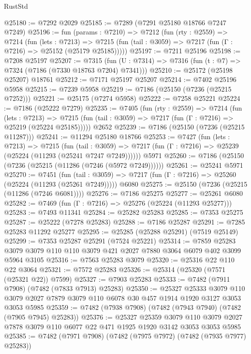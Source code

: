 \begin{lexlean}{RustStd}
\begin{coremodule}
{\begin{coremodule}
{{{{{{{{{{{{{{{{{{{{{{{{{{{{{{{{@25180 := @7292 @2029
@25185 := @7289 (@7291 @25180 @18766 @7247 @7249)
@25196 := fun (params : @7210) =>
  @7212
    (fun (rty : @2559) =>
    @7214
      (fun (lets : @7213) =>
      @7215 (fun (tail : @3059) => @7217 (fun (Γ : @7216) => @25152 (@25179 @25185)))))
@25197 := @7211 @25196
@25198 := @7208 @25197
@25207 := @7315
    (fun (U : @7314) => @7316 (fun (t : @7) => @7324 (@7186 (@7330 @18763 @7204) @7341)))
@25210 := @25172 (@25198 @25207) @18761
@25212 := @7171 @25197 @25207
@25214 := @7402 @25196 @5958
@25215 := @7239 @5958
@25219 := @7186 (@25150 (@7236 (@25215 @7252)))
@25221 := @25175 (@7274 @5958)
@25222 := @7258 @25221
@25224 := @7186 (@25222 @7279)
@25235 := @7405
    (fun (rty : @2559) =>
    @7214
      (fun (lets : @7213) =>
      @7215 (fun (tail : @3059) => @7217 (fun (Γ : @7216) => @25219 (@25224 @25185)))))
    @2652
@25239 := @7186 (@25150 (@7236 (@25215 @11287)))
@25241 := @11294 @25180 @18766
@25253 := @7427
    (fun (lets : @7213) =>
    @7215
      (fun (tail : @3059) =>
      @7217 (fun (Γ : @7216) => @25239 (@25224 (@11293 (@25241 @7247 @7249))))))
    @5971
@25260 := @7186 (@25150 (@7236 (@25215 (@11286 (@7246 (@5972 @7249))))))
@25261 := @25241 @5971
@25270 := @7451
    (fun (tail : @3059) => @7217 (fun (Γ : @7216) => @25260 (@25224 (@11293 (@25261 @7249)))))
    @6080
@25275 := @25150 (@7236 (@25215 (@11286 (@7246 @6081))))
@25276 := @7186 @25275
@25277 := @25261 @6080
@25282 := @7469 (fun (Γ : @7216) => @25276 (@25224 (@11293 @25277)))
@25283 := @7493 @11341
@25284 := @25282 @25283
@25285 := @7353 @25275
@25287 := @25222 (@7278 @25283)
@25288 := @7186 @25287
@25291 := @7285 @25283 @11292 @25277
@25295 := @25285 (@25288 @25291) (@7519 @25149)
@25299 := @7353 @25287 @25291 (@7524 @25221)
@25314 := @7859
    @25283
    @3079
    @3079
    @110
    @110
    @3079
    @421
    @2027
    @7880
    @3064
    @6079
    @402
    @3099
    @5964
    @3105
@25316 := @7563 @25283 @3079
@25320 := @25316 @22 @110 @22 @3064
@25321 := @7572 @25283
@25326 := @25314 (@25320 (@7571 (@25321 @22)) @7599)
@25327 := @7903 @25283
@25333 := @7482 (@7911 @7908) (@7482 (@7833 @7913) @25283)
@25350 := @25327
    @25333
    @3079
    @110
    @3079
    @2027
    @7879
    @3079
    @110
    @6078
    @30
    @457
    @1914
    @1920
    @3127
    @3053
    @3053
    @5985
@25359 := @7482 (@7938 @7908) (@7482 (@7943 @7940) (@7482 (@7905 @7945) @25283))
@25376 := @25327
    @25359
    @3079
    @110
    @3079
    @2027
    @7878
    @3079
    @110
    @6077
    @22
    @471
    @1925
    @1920
    @3142
    @3053
    @3053
    @5985
@25385 := @7482 (@7971 @7908) (@7482 (@7975 @7972) (@7482 (@7935 @7977) @25283))
}}}}}}}}}}}}}}}}}}}}}}}}}}}}}}}}
\end{coremodule}}
\end{coremodule}
\end{lexlean}
